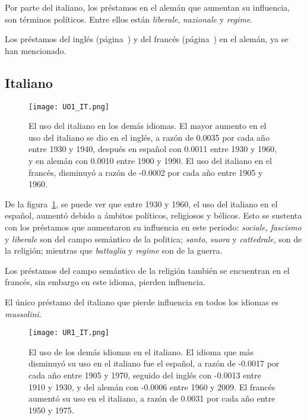 Por parte del italiano, los préstamos en el alemán que aumentan su influencia, son términos políticos. Entre ellos están \textit{liberale}, \textit{nazionale} y \textit{regime}. 

Los préstamos del inglés (página~\pageref{EN-D}) y del francés (página~\pageref{FR-D}) en el alemán, ya se han mencionado. 
\label{D-GE}



\subsection{Italiano} %

\begin{figure}[h!]
	\centering
	\texttt{[image: UO1\_IT.png]}
	\caption{El uso del italiano en los demás idiomas. El mayor aumento en el uso del italiano se dio en el inglés, a razón de 0.0035 por cada año entre 1930 y 1940, después en español con 0.0011 entre 1930 y 1960, y en alemán con 0.0010 entre 1900 y 1990. El uso del italiano en el francés, disminuyó a razón de -0.0002 por cada año entre 1905 y 1960.}
	\label{fig.UO_IT}
\end{figure}
		
De la figura~\ref{fig.UO_IT}, se puede ver que entre 1930 y 1960, el uso del italiano en el español, aumentó debido a ámbitos políticos, religiosos y bélicos. Esto se sustenta con los préstamos que aumentaron su influencia en este periodo:  \textit{sociale}, \textit{fascismo } y \textit{liberale} son del campo semántico de la politica; \textit{santo}, \textit{suora} y  \textit{cattedrale}, son de la religión; mientras que \textit{battaglia}  y \textit{regime} son de la guerra.
		
Los préstamos del campo semántico de la religión también se encuentran en el francés, sin embargo  en este idioma, pierden influencia. 

El único préstamo del italiano que pierde influencia en todos los idiomas es \textit{mussolini}.
\label{IT-D}

\begin{figure}[h!]
	\centering
	\texttt{[image: UR1\_IT.png]}
	\caption{El uso de los demás idiomas en el italiano. El idioma que más 
	disminuyó su uso en el italiano fue el español, a razón de -0.0017 por cada año entre 1905 y 1970, seguido del inglés con -0.0013 entre 1910 y 1930, y del alemán con -0.0006 entre 1960 y 2009. El francés aumentó su uso en el italiano, a razón de 0.0031 por cada año entre 1950 y 1975.}
	\label{fig.UR_IT}
\end{figure}

